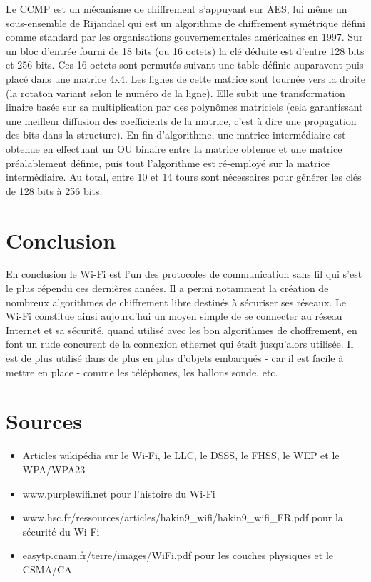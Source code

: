 \documentclass[12pt]{article}
\begin{document}
Le CCMP est un mécanisme de chiffrement s'appuyant sur AES, lui même un sous-ensemble de Rijandael qui est un algorithme de chiffrement symétrique défini comme standard par les organisations gouvernementales américaines en 1997. Sur un bloc d'entrée fourni de 18 bits (ou 16 octets) la clé déduite est d'entre 128 bits et 256 bits. Ces 16 octets sont permutés suivant une table définie auparavent puis placé dans une matrice 4x4. Les lignes de cette matrice sont tournée vers la droite (la rotaton variant selon le numéro de la ligne). Elle subit une transformation linaire basée sur sa multiplication par des polynômes matriciels (cela garantissant une meilleur diffusion des coefficients de la matrice, c'est à dire une propagation des bits dans la structure). En fin d'algorithme, une matrice intermédiaire est obtenue en effectuant un OU binaire entre la matrice obtenue et une matrice préalablement définie, puis tout l'algorithme est ré-employé sur la matrice intermédiaire. Au total, entre 10 et 14 tours sont nécessaires pour générer les clés de 128 bits à 256 bits.

\newpage
\section{Conclusion}

En conclusion le Wi-Fi est l'un des protocoles de communication sans fil qui s'est le plus répendu ces dernières années. Il a permi notamment la création de nombreux algorithmes de chiffrement libre destinés à sécuriser ses réseaux. Le Wi-Fi constitue ainsi aujourd'hui un moyen simple de se connecter au réseau Internet et sa sécurité, quand utilisé avec les bon algorithmes de choffrement, en font un rude concurent de la connexion ethernet qui était jusqu'alors utilisée. Il est de plus utilisé dans de plus en plus d'objets embarqués - car il est facile à mettre en place - comme les téléphones, les ballons sonde, etc.

\newpage
\section{Sources}
\begin{itemize}
	\item Articles wikipédia sur le Wi-Fi, le LLC, le DSSS, le FHSS, le WEP et le WPA/WPA23
	\item www.purplewifi.net pour l'histoire du Wi-Fi
	\item www.hsc.fr/ressources/articles/hakin9\_wifi/hakin9\_wifi\_FR.pdf pour la sécurité du Wi-Fi
	\item easytp.cnam.fr/terre/images/WiFi.pdf pour les couches physiques et le CSMA/CA
\end{itemize}
\end{document}
